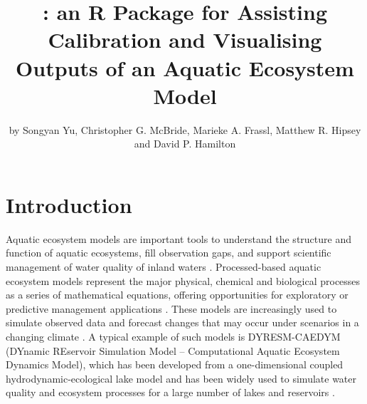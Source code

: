 \title{: an R Package for Assisting Calibration and Visualising Outputs of an Aquatic Ecosystem Model}
\author{by Songyan Yu, Christopher G. McBride, Marieke A. Frassl, Matthew R. Hipsey and David P. Hamilton}

\maketitle


\section{Introduction}

Aquatic ecosystem models are important tools to understand the structure and function of aquatic ecosystems, fill observation gaps, and support scientific management of water quality of inland waters \citep{jakeman2006ten}. Processed-based aquatic ecosystem models represent the major physical, chemical and biological processes as a series of mathematical equations, offering opportunities for exploratory or predictive management applications \citep{frassl2019short, ozkundakci2011modelling}. These models are increasingly used to simulate observed data and forecast changes that may occur under scenarios in a changing climate \citep{elliott2012future,nielsen2017open,rousso2020systematic}. A typical example of such models is DYRESM-CAEDYM (DYnamic REservoir Simulation Model – Computational Aquatic Ecosystem Dynamics Model), which has been developed from a one-dimensional coupled hydrodynamic-ecological lake model \citep{hamilton1997prediction} and has been widely used to simulate water quality and ecosystem processes for a large number of lakes and reservoirs \citep{cui2016modeling,lewis2004numerical,takkouk2016application}.\par

